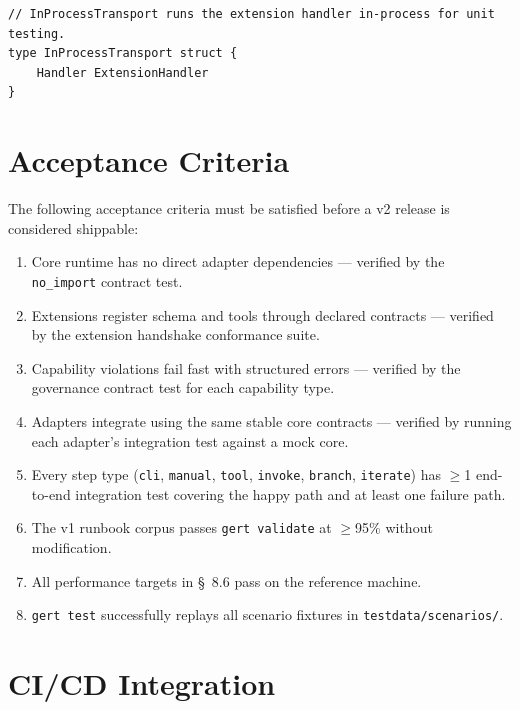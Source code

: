 \begin{verbatim}
// InProcessTransport runs the extension handler in-process for unit testing.
type InProcessTransport struct {
    Handler ExtensionHandler
}
\end{verbatim}

\section{Acceptance Criteria}

The following acceptance criteria must be satisfied before a v2 release is considered shippable:

\begin{enumerate}[label=\arabic*.]
  \item Core runtime has no direct adapter dependencies — verified by the \texttt{no\_import} contract test.
  \item Extensions register schema and tools through declared contracts — verified by the extension handshake conformance suite.
  \item Capability violations fail fast with structured errors — verified by the governance contract test for each capability type.
  \item Adapters integrate using the same stable core contracts — verified by running each adapter's integration test against a mock core.
  \item Every step type (\texttt{cli}, \texttt{manual}, \texttt{tool}, \texttt{invoke}, \texttt{branch}, \texttt{iterate}) has $\geq$1 end-to-end integration test covering the happy path and at least one failure path.
  \item The v1 runbook corpus passes \texttt{gert validate} at $\geq$95\% without modification.
  \item All performance targets in \S~8.6 pass on the reference machine.
  \item \texttt{gert test} successfully replays all scenario fixtures in \texttt{testdata/scenarios/}.
\end{enumerate}

\section{CI/CD Integration}


